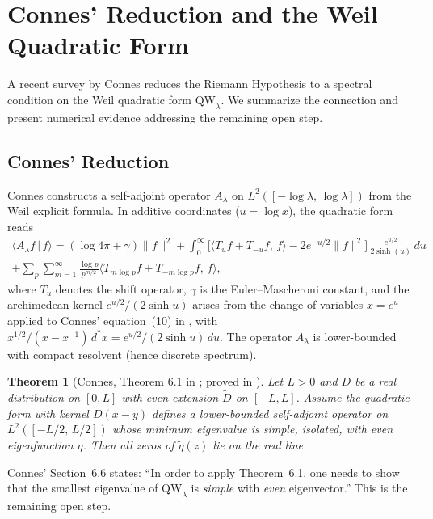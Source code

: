 \documentclass[12pt,a4paper]{article}
\newtheorem{theorem}{Theorem}[section]
\theoremstyle{definition}
\theoremstyle{remark}
\begin{document}
\section{Connes' Reduction and the Weil Quadratic Form}
\label{sec:connes}

A recent survey by Connes \cite{Connes2026} reduces the Riemann Hypothesis to a spectral condition on the Weil quadratic form $\mathrm{QW}_\lambda$. We summarize the connection and present numerical evidence addressing the remaining open step.

\subsection{Connes' Reduction}

Connes constructs a self-adjoint operator $A_\lambda$ on $L^2([-\log\lambda,\,\log\lambda])$ from the Weil explicit formula. In additive coordinates ($u = \log x$), the quadratic form reads
\begin{multline*}
  \langle A_\lambda f \,|\, f \rangle = (\log 4\pi + \gamma)\|f\|^2
  + \int_0^\infty \Big[\langle T_u f + T_{-u} f,\, f \rangle - 2e^{-u/2}\|f\|^2\Big]\,\frac{e^{u/2}}{2\sinh(u)}\,du \\
  + \sum_p \sum_{m=1}^\infty \frac{\log p}{p^{m/2}} \langle T_{m\log p} f + T_{-m\log p} f,\, f \rangle,
\end{multline*}
where $T_u$ denotes the shift operator, $\gamma$ is the Euler--Mascheroni constant, and the archimedean kernel $e^{u/2}/(2\sinh u)$ arises from the change of variables $x = e^u$ applied to Connes' equation~(10) in \cite{Connes2026}, with $x^{1/2}/(x-x^{-1})\,d^*\!x = e^{u/2}/(2\sinh u)\,du$. The operator $A_\lambda$ is lower-bounded with compact resolvent (hence discrete spectrum).

\begin{theorem}[Connes, Theorem 6.1 in \cite{Connes2026}; proved in \cite{ConnesvS2025}]
Let $L > 0$ and $D$ be a real distribution on $[0,L]$ with even extension $\tilde{D}$ on $[-L,L]$. Assume the quadratic form with kernel $\tilde{D}(x-y)$ defines a lower-bounded self-adjoint operator on $L^2([-L/2,\,L/2])$ whose minimum eigenvalue is simple, isolated, with even eigenfunction $\eta$. Then all zeros of $\tilde{\eta}(z)$ lie on the real line.
\end{theorem}

\noindent Connes' Section~6.6 states: ``In order to apply Theorem~6.1, one needs to show that the smallest eigenvalue of $\mathrm{QW}_\lambda$ is \emph{simple} with \emph{even} eigenvector.'' This is the remaining open step.
\end{document}
